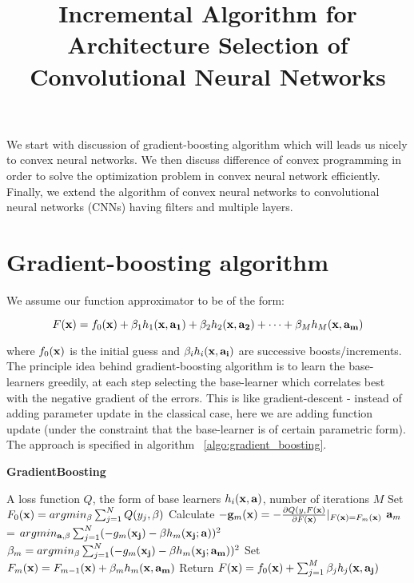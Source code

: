 \documentclass{article}
\title{Incremental Algorithm for Architecture Selection of Convolutional Neural Networks}
\begin{document}
\maketitle

We start with discussion of gradient-boosting algorithm which will leads us nicely to convex neural networks. We then discuss difference of convex programming in order to solve the optimization problem in convex neural network efficiently. Finally, we extend the algorithm of convex neural networks to convolutional neural networks (CNNs) having filters and multiple layers.

\section{Gradient-boosting algorithm}
\label{sec:grad_boosting}
We assume our function approximator to be of the form:

\begin{equation}
	F({\bf x}) = f_0({\bf x}) + \beta_1 h_1({\bf x, a_1}) + \beta_2 h_2({\bf x, a_2}) + \dots + \beta_M h_M({\bf x, a_m})  
\end{equation}

where $f_0({\bf x})$ is the initial guess and $\beta_i h_i({\bf x, a_i})$ are successive boosts/increments. The principle idea behind gradient-boosting algorithm is to learn the base-learners greedily, at each step selecting the base-learner which correlates best with the negative gradient of the errors. This is like gradient-descent - instead of adding parameter update in the classical case, here we are adding function update (under the constraint that the base-learner is of certain parametric form). The approach is specified in algorithm ~\ref{algo:gradient_boosting}.

\begin{algorithm}
\caption{{\bf GradientBoosting} \cite{friedman2001greedy}}\label{algo:gradient_boosting}
\begin{algorithmic}[1]
 A loss function $Q$, the form of base learners $h_{i}({\bf x, a})$, number of iterations $M$
\STATE Set $F_0({\bf x}) = argmin_{\beta}  \sum_{j = 1}^{N} Q(y_j, \beta)$
\STATE Calculate $-{\bf g}_m({\bf x}) = - \frac{\partial Q(y, F{\bf(x)}}{\partial F{\bf(x)}}|_{F({\bf x}) = F_m({\bf x})}$
\STATE ${\bf a}_m$ = $argmin_{{\bf a}, \beta} \sum_{j = 1}^{N} (- g_m({\bf x_j}) - \beta h_m({\bf x_j;a}))^2$
\STATE $\beta_m = argmin_{\beta}  \sum_{j = 1}^{N} (- g_m({\bf x_j}) - \beta h_m({\bf x_j;a_m}))^2$
\STATE Set $F_m({\bf x}) = F_{m - 1}({\bf x}) + \beta_m h_m({\bf x, a_m})$
\ENDFOR
\STATE Return $F({\bf x}) = f_0({\bf x}) + \sum_{j = 1}^{M} \beta_j h_j({\bf x, a_j})$
\end{algorithmic}
\end{algorithm}
\end{document}
